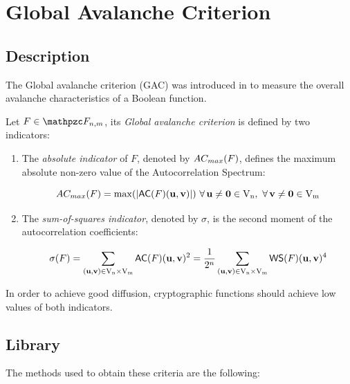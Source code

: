 \section{Global Avalanche Criterion}

\subsection{Description}

The Global avalanche criterion (GAC) was introduced in \cite{zhang95gac} to measure the overall avalanche characteristics of a Boolean function.

\begin{definition}
 \cite{zhang95gac} Let $F \in \funct{F}_{n,m}$, its \textit{Global avalanche criterion} is defined by two indicators:

\begin{enumerate}

\item The \textit{absolute indicator} of $F$, denoted by $\crit{AC_{max}}(F)$, defines the maximum absolute non-zero value of the Autocorrelation Spectrum:

\begin{equation}
    \crit{AC_{max}}(F) = \max(|\matr{AC}(F)(\vec{u},\vec{v})|) \ \fa \vec{u} \neq \vec{0} \in \gf{V_n}, \ \fa \vec{v} \neq \vec{0} \in \gf{V_m}
\end{equation}

\item The \textit{sum-of-squares indicator}, denoted by $\sigma$, is the second moment of the autocorrelation coefficients:

\begin{equation}
    \sigma(F) = \sum_{(\vec{u},\vec{v}) \in \gf{V_n} \times \gf{V_m}} \matr{AC}(F)(\vec{u},\vec{v})^2 =  \frac{1}{2^n} \sum_{(\vec{u},\vec{v}) \in \gf{V_n} \times \gf{V_m}} \matr{WS}(F)(\vec{u},\vec{v})^4 
\end{equation}
 
\end{enumerate}
\end{definition}

In order to achieve good diffusion, cryptographic functions should achieve low values of both indicators.

\subsection{Library}

The methods used to obtain these criteria are the following:

